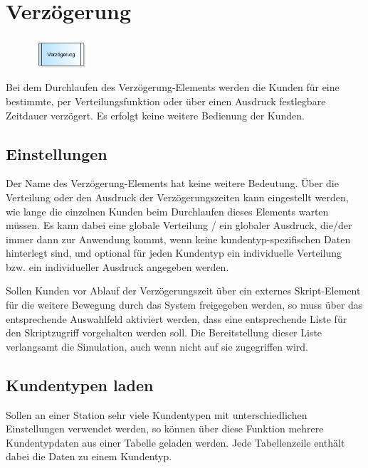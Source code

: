 \section{Verzögerung}
\label{ref:ModelElementDelay}

\begin{figure}
\vspace{-22pt}
\includegraphics[width=2cm]{imageModelElementDelay.png}
\vspace{-22pt}
\end{figure}

Bei dem Durchlaufen des Verzögerung-Elements werden die Kunden für eine bestimmte, per Verteilungsfunktion oder über
einen Ausdruck festlegbare Zeitdauer verzögert. Es erfolgt keine weitere Bedienung der Kunden.

\subsection*{Einstellungen}

Der Name des Verzögerung-Elements hat keine weitere Bedeutung. Über die Verteilung oder den Ausdruck der Verzögerungszeiten kann
eingestellt werden, wie lange die einzelnen Kunden beim Durchlaufen dieses Elements warten müssen.
Es kann dabei eine globale Verteilung / ein globaler Ausdruck, die/der immer dann zur Anwendung kommt, wenn keine
kundentyp-spezifischen Daten hinterlegt sind, und optional für jeden Kundentyp ein individuelle
Verteilung bzw. ein individueller Ausdruck angegeben werden.

Sollen Kunden vor Ablauf der Verzögerungszeit über ein externes Skript-Element für die weitere Bewegung durch das System
freigegeben werden, so muss über das entsprechende Auswahlfeld aktiviert werden, dass eine entsprechende Liste für den
Skriptzugriff vorgehalten werden soll. Die Bereitstellung dieser Liste verlangsamt die Simulation, auch wenn nicht auf
sie zugegriffen wird.

\subsection*{Kundentypen laden}

Sollen an einer Station sehr viele Kundentypen mit unterschiedlichen Einstellungen verwendet werden, so können über diese Funktion mehrere Kundentypdaten aus einer Tabelle geladen werden. Jede Tabellenzeile enthält dabei die Daten zu einem Kundentyp.

